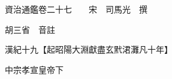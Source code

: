 










 


 
 


 

  
  
  
  
  





  
  
  
  
  
 
  

  

  
  
  



  

 
 

  
   




  

  
  


  　　資治通鑑卷二十七　　宋　司馬光　撰

　　胡三省　音註

　　漢紀十九【起昭陽大淵獻盡玄黓涒灘凡十年】

　　中宗孝宣皇帝下

